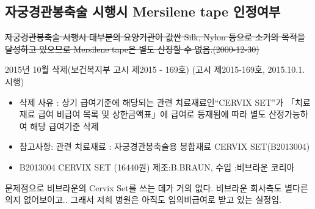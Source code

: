\subsection{자궁경관봉축술 시행시 Mersilene tape 인정여부}
\sout{자궁경관봉축술 시행시 대부분의 요양기관이 값싼 Silk, Nylon 등으로 소기의 목적을 달성하고 있으므로 Mersilene tape은 별도 산정할 수 없음.(2000-12-30)}\par
2015년 10월 삭제(보건복지부 고시 제2015 - 169호) (고시 제2015-169호, 2015.10.1.시행)
\begin{itemize}[▶]\tightlist
\item 삭제 사유 : 상기 급여기준에 해당되는 관련 치료재료인“CERVIX SET”가 「치료재료 급여 비급여 목록 및 상한금액표」에 급여로 등재됨에 따라 별도 산정가능하여 해당 급여기준 삭제
\item 참고사항: 관련 치료재료 : 자궁경관봉축술용 봉합재료 CERVIX SET(B2013004) 
\item B2013004 CERVIX SET (16440원) 제조:B.BRAUN, 수입 :비브라운 코리아
\end{itemize}
\begin{myshadowbox}
문제점으로 비브라운의 Cervix Set를 쓰는 데가 거의 없다. 비브라운 회사측도 별다른 의지 없어보이고.. 그래서 저희 병원은 아직도 임의비급여로 받고 있는 실정임.
\end{myshadowbox}